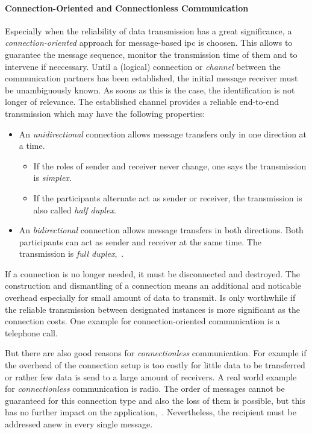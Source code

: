 \paragraph{Connection-Oriented and Connectionless Communication}
Especially when the reliability of data transmission has a great significance, a \textit{connection-oriented} approach for message-based \ac{ipc} is choosen.
This allows to guarantee the message sequence, monitor the transmission time of them and to intervene if neccessary\cite{glatz2015betriebssysteme}.
Until a (logical) connection or \textit{channel} between the communication partners has been established, the initial message receiver must be unambiguously known.
As soons as this is the case, the identification is not longer of relevance.
The established channel provides a reliable end-to-end transmission which may have the following properties:
%
\begin{itemize}
    \item An \textit{unidirectional} connection allows message transfers only in one direction at a time. 
        \begin{itemize}
            \item If the roles of sender and receiver never change, one says the transmission is \textit{simplex}.
            \item If the participants alternate act as sender or receiver, the transmission is also called \textit{half duplex}.
        \end{itemize}
    \item An \textit{bidirectional} connection allows message transfers in both directions. Both participants can act as sender and receiver at the same time. The transmission is \textit{full duplex}\cite{brause2017betriebssysteme},~\cite{glatz2015betriebssysteme}.
\end{itemize}
%
If a connection is no longer needed, it must be disconnected and destroyed.
The construction and dismantling of a connection means an additional and noticable overhead especially for small amount of data to transmit.
Is only worthwhile if the reliable transmission between designated instances is more significant as the connection costs\cite{glatz2015betriebssysteme}.
One example for connection-oriented communication is a telephone call.

But there are also good reasons for \textit{connectionless} communication.
For example if the overhead of the connection setup is too costly for little data to be transferred or rather few data is send to a large amount of receivers.
A real world example for \textit{connectionless} communication is radio.
The order of messages cannot be guaranteed for this connection type and also the loss of them is possible, but this has no further impact on the application\cite{glatz2015betriebssysteme},~\cite{brause2017betriebssysteme}.
Nevertheless, the recipient must be addressed anew in every single message.

